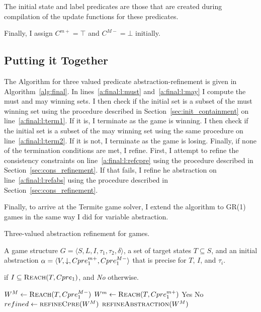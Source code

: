 The initial state and label predicates are those that are created during compilation of the update functions for these predicates.

Finally, I assign $C^{m+}=\top$ and $C^{M-}=\bot$ initially.

\subsection{Putting it Together}

The Algorithm for three valued predicate abstraction-refinement is given in Algorithm~\ref{alg:final}. In lines~\ref{a:final:l:must} and~\ref{a:final:l:may} I compute the must and may winning sets. I then check if the initial set is a subset of the must winning set using the procedure described in Section~\ref{sec:init_containment} on line~\ref{a:final:l:term1}. If it is, I terminate as the game is winning. I then check if the initial set is a subset of the may winning set using the same procedure on line~\ref{a:final:l:term2}. If it is not, I terminate as the game is losing. Finally, if none of the termination conditions are met, I refine. First, I attempt to refine the consistency constraints on line~\ref{a:final:l:refcpre} using the procedure described in Section~\ref{sec:cons_refinement}. If that fails, I refine he abstraction on line~\ref{a:final:l:refabs} using the procedure described in Section~\ref{sec:cons_refinement}.

Finally, to arrive at the Termite game solver, I extend the algorithm to GR(1) games in the same way I did for variable abstraction.

\begin{algorithm}
\caption{Three-valued abstraction refinement for games.}
\label{alg:final}

\begin{algorithmic}[1]

\Require A game structure $G = \langle S, L, I, \tau_1, \tau_2, \delta \rangle$, a set of target states $T\subseteq S$, and an initial abstraction $\alpha=\langle V, \mathord{\downarrow}, Cpre_1^{m+}, Cpre_1^{M-} \rangle$ that is precise for $T$, $I$, and $\tau_i$.

 if $I \subseteq \textsc{Reach}(T, Cpre_1)$, and {\it No} otherwise.

    \Loop
        \State $W^M \gets \textsc{Reach}(T, Cpre_1^{M-})$             \label{a:final:l:must}
        \State $W^m \gets \textsc{Reach}(T, Cpre_1^{m+})$             \label{a:final:l:may}
            \label{a:final:l:term1}
            \State\Return Yes
         \label{a:final:l:term2}
            \State\Return No
        \Else       
            \State $refined \gets \Call{refineCpre}{W^M}$     \label{a:final:l:refcpre}
                \State$\Call{refineAbstraction}{W^M}$         \label{a:final:l:refabs}
            \EndIf
        \EndIf
    \EndLoop
\EndFunction

\end{algorithmic}
\end{algorithm}


